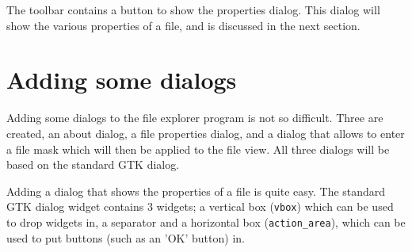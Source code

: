\documentclass[10pt]{article}
\begin{document}
The toolbar contains a button to show the properties dialog. This dialog
will show the various properties of a file, and is discussed in the next
section.

\section{Adding some dialogs}
Adding some dialogs to the file explorer program is not so difficult.
Three are created, an about dialog, a file properties dialog, and a dialog
that allows to enter a file mask which will then be applied to the file
view. All three dialogs will be based on the standard GTK dialog.

Adding a dialog that shows the properties of a file is quite easy. 
The standard GTK dialog widget contains 3 widgets; a vertical box 
(\lstinline|vbox|) which can be used to drop widgets in, a separator 
and a horizontal box (\lstinline|action_area|), which can be used to 
put buttons (such as an 'OK' button) in.
\end{document}
